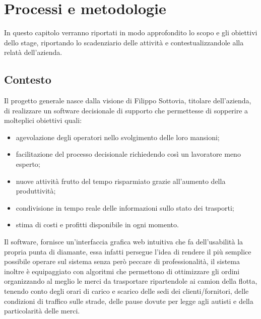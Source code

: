 \hypertarget{(chap:processi_metodologie)}{}
\chapter{Processi e metodologie}
In questo capitolo verranno riportati in modo approfondito lo scopo e gli obiettivi dello stage, riportando lo scadenziario delle attività e contestualizzandole alla relatà dell'azienda.

\section{Contesto}
Il progetto generale nasce dalla visione di Filippo Sottovia, titolare dell'azienda, di realizzare un software decisionale di supporto che permettesse di sopperire a molteplici obiettivi quali:
\begin{itemize}
    \item agevolazione degli operatori nello svolgimento delle loro mansioni;
    \item facilitazione del processo decisionale richiedendo così un lavoratore meno esperto;
    \item nuove attività frutto del tempo risparmiato grazie all'aumento della produttività;
    \item condivisione in tempo reale delle informazioni sullo stato dei trasporti;
    \item stima di costi e profitti disponibile in ogni momento.
\end{itemize}
\noindent Il software, fornisce un'interfaccia grafica web intuitiva che fa dell'usabilità la propria punta di diamante, essa infatti persegue l'idea di rendere il più semplice possibile operare sul sistema senza però peccare di professionalità, il sistema inoltre è equipaggiato con algoritmi che permettono di ottimizzare gli ordini organizzando al meglio le merci da trasportare ripartendole ai camion della flotta, tenendo conto degli orari di carico e scarico delle sedi dei clienti/fornitori, delle condizioni di traffico sulle strade, delle pause dovute per legge agli autisti e della particolarità delle merci.

